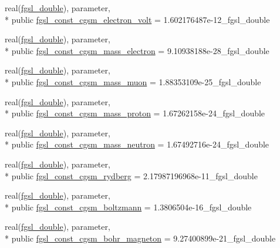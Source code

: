 \begin{DoxyCompactItemize}
\item 
real(\hyperlink{classfgsl_a9af5113378e0f000eb479d3f90196ddf}{fgsl\-\_\-double}), parameter, \\*
public \hyperlink{classfgsl_aeec1dd933fc3bc5a582363056455d46c}{fgsl\-\_\-const\-\_\-cgsm\-\_\-electron\-\_\-volt} = 1.\-602176487e-\/12\-\_\-fgsl\-\_\-double
\item 
real(\hyperlink{classfgsl_a9af5113378e0f000eb479d3f90196ddf}{fgsl\-\_\-double}), parameter, \\*
public \hyperlink{classfgsl_a8b5c993b964f03b76098558c24095fd4}{fgsl\-\_\-const\-\_\-cgsm\-\_\-mass\-\_\-electron} = 9.\-10938188e-\/28\-\_\-fgsl\-\_\-double
\item 
real(\hyperlink{classfgsl_a9af5113378e0f000eb479d3f90196ddf}{fgsl\-\_\-double}), parameter, \\*
public \hyperlink{classfgsl_a3092e1888259499b77e1dc358db86c58}{fgsl\-\_\-const\-\_\-cgsm\-\_\-mass\-\_\-muon} = 1.\-88353109e-\/25\-\_\-fgsl\-\_\-double
\item 
real(\hyperlink{classfgsl_a9af5113378e0f000eb479d3f90196ddf}{fgsl\-\_\-double}), parameter, \\*
public \hyperlink{classfgsl_aefda043fac3adf36e5c9142193d24ef6}{fgsl\-\_\-const\-\_\-cgsm\-\_\-mass\-\_\-proton} = 1.\-67262158e-\/24\-\_\-fgsl\-\_\-double
\item 
real(\hyperlink{classfgsl_a9af5113378e0f000eb479d3f90196ddf}{fgsl\-\_\-double}), parameter, \\*
public \hyperlink{classfgsl_aa4c1d627604e0ff04d68a92847dc1a00}{fgsl\-\_\-const\-\_\-cgsm\-\_\-mass\-\_\-neutron} = 1.\-67492716e-\/24\-\_\-fgsl\-\_\-double
\item 
real(\hyperlink{classfgsl_a9af5113378e0f000eb479d3f90196ddf}{fgsl\-\_\-double}), parameter, \\*
public \hyperlink{classfgsl_a0f2cb7b75a4fd58c54e5a0b794da13b6}{fgsl\-\_\-const\-\_\-cgsm\-\_\-rydberg} = 2.\-17987196968e-\/11\-\_\-fgsl\-\_\-double
\item 
real(\hyperlink{classfgsl_a9af5113378e0f000eb479d3f90196ddf}{fgsl\-\_\-double}), parameter, \\*
public \hyperlink{classfgsl_abe34761700d2098a3dcde1e962938eb4}{fgsl\-\_\-const\-\_\-cgsm\-\_\-boltzmann} = 1.\-3806504e-\/16\-\_\-fgsl\-\_\-double
\item 
real(\hyperlink{classfgsl_a9af5113378e0f000eb479d3f90196ddf}{fgsl\-\_\-double}), parameter, \\*
public \hyperlink{classfgsl_a106f93e7068726bf01947287eb77faed}{fgsl\-\_\-const\-\_\-cgsm\-\_\-bohr\-\_\-magneton} = 9.\-27400899e-\/21\-\_\-fgsl\-\_\-double

\end{DoxyCompactItemize}
